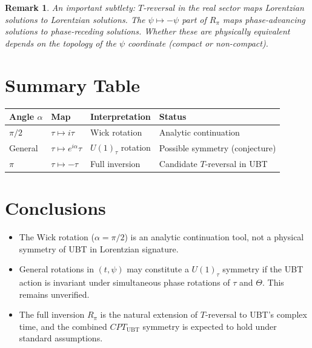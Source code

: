 \documentclass[12pt]{article}
\newtheorem{remark}{Remark}
\begin{document}
\begin{remark}
An important subtlety: $T$-reversal in the real sector maps Lorentzian
solutions to Lorentzian solutions.  The $\psi \mapsto -\psi$ part of
$R_\pi$ maps phase-advancing solutions to phase-receding solutions.
Whether these are physically equivalent depends on the topology of the
$\psi$ coordinate (compact or non-compact).
\end{remark}

\section{Summary Table}
\begin{center}
\renewcommand{\arraystretch}{1.4}
\begin{tabular}{|l|l|l|l|}
\hline
\textbf{Angle $\alpha$} & \textbf{Map} & \textbf{Interpretation} & \textbf{Status}\\
\hline
$\pi/2$ & $\tau \mapsto i\tau$ & Wick rotation & Analytic continuation\\
General & $\tau \mapsto e^{i\alpha}\tau$ & $U(1)_\tau$ rotation & Possible symmetry (conjecture)\\
$\pi$ & $\tau \mapsto -\tau$ & Full inversion & Candidate $T$-reversal in UBT\\
\hline
\end{tabular}
\end{center}

\section{Conclusions}
\begin{itemize}
  \item The Wick rotation ($\alpha=\pi/2$) is an analytic continuation
    tool, not a physical symmetry of UBT in Lorentzian signature.
  \item General rotations in $(t,\psi)$ may constitute a $U(1)_\tau$
    symmetry if the UBT action is invariant under simultaneous phase
    rotations of $\tau$ and $\Theta$.  This remains unverified.
  \item The full inversion $R_\pi$ is the natural extension of
    $T$-reversal to UBT's complex time, and the combined $CPT_{\mathrm{UBT}}$
    symmetry is expected to hold under standard assumptions.
\end{itemize}
\end{document}
